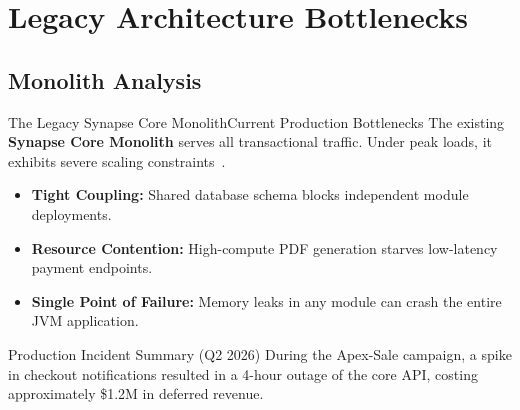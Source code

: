 \section{Legacy Architecture Bottlenecks}
\subsection{Monolith Analysis}

\begin{frame}{The Legacy Synapse Core Monolith}{Current Production Bottlenecks}
  The existing \textbf{Synapse Core Monolith} serves all transactional traffic. Under peak loads, it exhibits severe scaling constraints~\cite{meridian2024monolith}.
  
  \vspace{0.2cm}
  \begin{itemize}
    \item \textbf{Tight Coupling:} Shared database schema blocks independent module deployments.
    \item \textbf{Resource Contention:} High-compute PDF generation starves low-latency payment endpoints.
    \item \textbf{Single Point of Failure:} Memory leaks in any module can crash the entire JVM application.
  \end{itemize}

  \vspace{0.4cm}
  \begin{minipage}{\textwidth}
    \begin{dangerbox}{Production Incident Summary (Q2 2026)}
      During the Apex-Sale campaign, a spike in checkout notifications resulted in a 4-hour outage of the core API, costing approximately \$1.2M in deferred revenue.
    \end{dangerbox}
  \end{minipage}
\end{frame}
